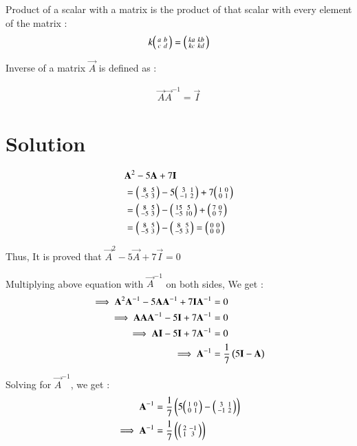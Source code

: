 \documentclass[journal,12pt,twocolumn]{IEEEtran}
\begin{document}
Product of a scalar with a matrix is the product of that scalar with every element of the matrix : 
\begin{align}
 k\begin{psmallmatrix} a & b\\c & d\end{psmallmatrix}  = \begin{psmallmatrix} ka & kb\\kc & kd\end{psmallmatrix}  
\end{align}

Inverse of a matrix $\vec{A}$ is defined as  :
  
\begin{align}
    \vec{A}  \vec{A}^{-1} = \vec{I}
\end{align}

\section{Solution}


 

\begin{align}
&   \mathbf{A}^2 - 5\mathbf{A} + 7\mathbf{I} \\
&= \begin{psmallmatrix} 8 & 5\\ -5 & 3\end{psmallmatrix} -  5\begin{psmallmatrix} 3 & 1\\ -1 & 2\end{psmallmatrix} + 7\begin{psmallmatrix} 1 & 0\\ 0 & 1\end{psmallmatrix}  \\
&= \begin{psmallmatrix} 8 & 5\\ -5 & 3\end{psmallmatrix} -  \begin{psmallmatrix} 15 & 5\\ -5 & 10\end{psmallmatrix} + \begin{psmallmatrix} 7 & 0\\ 0 & 7\end{psmallmatrix}\\
&= \begin{psmallmatrix} 8 & 5\\ -5 & 3\end{psmallmatrix} - \begin{psmallmatrix} 8 & 5\\ -5 & 3\end{psmallmatrix} = \begin{psmallmatrix} 0 & 0\\ 0 & 0\end{psmallmatrix} 
\end{align}


Thus, It is proved that $\vec{A}^2 - 5\vec{A} + 7\vec{I} = 0$

Multiplying above equation with $\vec{A}^{-1}$ on both sides, We get :
\begin{align}
\implies \mathbf{A}^2\mathbf{A}^{-1} - 5\mathbf{A}\mathbf{A}^{-1} + 7\mathbf{I}\mathbf{A}^{-1} &= 0 \\
\implies \mathbf{A}\mathbf{A}\mathbf{A}^{-1} - 5\mathbf{I} + 7\mathbf{A}^{-1} &= 0 \\
\implies \mathbf{A}\mathbf{I} - 5\mathbf{I} + 7\mathbf{A}^{-1} &= 0\\
\implies \mathbf{A}^{-1} &= \frac{1}{7}\left(5\mathbf{I} - \mathbf{A}\right)
\end{align}

Solving for $\vec{A}^{-1}$, we get :
\begin{align}
    \mathbf{A}^{-1} &= \frac{1}{7}\left(5\begin{psmallmatrix} 1 & 0\\ 0 & 1\end{psmallmatrix} - \begin{psmallmatrix} 3 & 1\\ -1 & 2\end{psmallmatrix}\right) \\
    \implies \mathbf{A}^{-1} &= \frac{1}{7}\left(\begin{psmallmatrix} 2 & -1\\ 1 & 3\end{psmallmatrix}\right)
\end{align}
\end{document}
